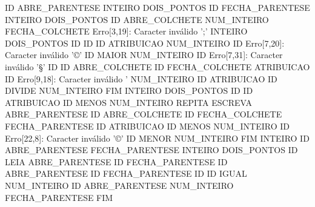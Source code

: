 \documentclass[12pt]{article}
\begin{document}
\begin{ lstlisting}[language=Python]
  ID
  ABRE_PARENTESE
  INTEIRO
  DOIS_PONTOS
  ID
  FECHA_PARENTESE
  INTEIRO
  DOIS_PONTOS
  ID
  ABRE_COLCHETE
  NUM_INTEIRO
  FECHA_COLCHETE
  Erro[3,19]: Caracter inválido ';'
  INTEIRO
  DOIS_PONTOS
  ID
  ID
  ID
  ATRIBUICAO
  NUM_INTEIRO
  ID
  Erro[7,20]: Caracter inválido '©'
  ID
  MAIOR
  NUM_INTEIRO
  ID
  Erro[7,31]: Caracter inválido '§'
  ID
  ID
  ABRE_COLCHETE
  ID
  FECHA_COLCHETE
  ATRIBUICAO
  ID
  Erro[9,18]: Caracter inválido '%
  NUM_INTEIRO
  ID
  ATRIBUICAO
  ID
  DIVIDE
  NUM_INTEIRO
  FIM
  INTEIRO
  DOIS_PONTOS
  ID
  ID
  ATRIBUICAO
  ID
  MENOS
  NUM_INTEIRO
  REPITA
  ESCREVA
  ABRE_PARENTESE
  ID
  ABRE_COLCHETE
  ID
  FECHA_COLCHETE
  FECHA_PARENTESE
  ID
  ATRIBUICAO
  ID
  MENOS
  NUM_INTEIRO
  ID
  Erro[22,8]: Caracter inválido '©'
  ID
  MENOR
  NUM_INTEIRO
  FIM
  INTEIRO
  ID
  ABRE_PARENTESE
  FECHA_PARENTESE
  INTEIRO
  DOIS_PONTOS
  ID
  LEIA
  ABRE_PARENTESE
  ID
  FECHA_PARENTESE
  ID
  ABRE_PARENTESE
  ID
  FECHA_PARENTESE
  ID
  ID
  IGUAL
  NUM_INTEIRO
  ID
  ABRE_PARENTESE
  NUM_INTEIRO
  FECHA_PARENTESE
  FIM
\end{ lstlisting}






\end{document}
